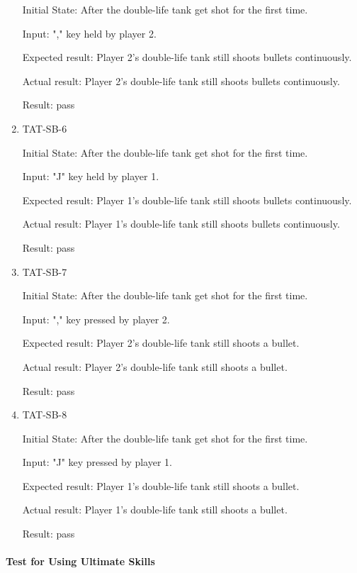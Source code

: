 \documentclass[12pt, titlepage]{article}
\begin{document}
\begin{enumerate}
Initial State: After the double-life tank get shot for the first time.
					
Input: "," key held by player 2.
					
Expected result: Player 2's double-life tank still shoots bullets continuously.
					
Actual result: Player 2's double-life tank still shoots bullets continuously.

Result: pass

\item{TAT-SB-6\\}
					
Initial State: After the double-life tank get shot for the first time.
					
Input: "J" key held by player 1.
					
Expected result: Player 1's double-life tank still shoots bullets continuously.
					
Actual result: Player 1's double-life tank still shoots bullets continuously.

Result: pass

\item{TAT-SB-7\\}
					
Initial State: After the double-life tank get shot for the first time.
					
Input: "," key pressed by player 2.
					
Expected result: Player 2's double-life tank still shoots a bullet.
					
Actual result: Player 2's double-life tank still shoots a bullet.

Result: pass

\item{TAT-SB-8\\}
					
Initial State: After the double-life tank get shot for the first time.
					
Input: "J" key pressed by player 1.
					
Expected result: Player 1's double-life tank still shoots a bullet.
					
Actual result: Player 1's double-life tank still shoots a bullet.

Result: pass

\end{enumerate}

\paragraph{Test for Using Ultimate Skills}
\end{document}
